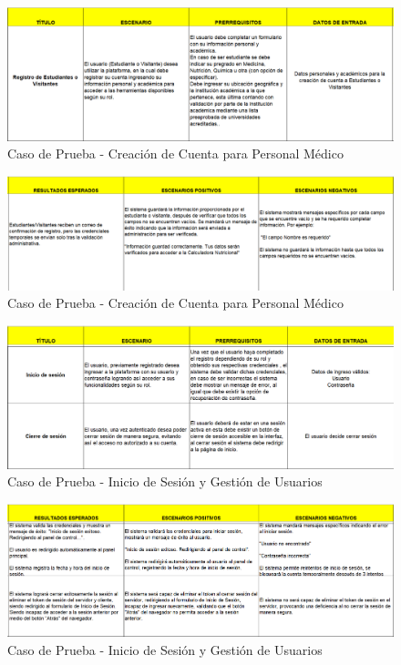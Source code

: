 \documentclass[12pt,letterpaper,spanish, xcolor=table]{report}
\numberwithin{figure}{subsection}
\begin{document}
	\begin{figure}[H]
		\centering
		\includegraphics[width=1.0\textwidth]
		{Imagenes/CalculadoraNutricional/CPCuentaEstudiante.png}
		\caption{Caso de Prueba - Creación de Cuenta para Personal Médico
		}\label{a2}
	\end{figure}
	
	\begin{figure}[H]
		\centering
		\includegraphics[width=1.0\textwidth]
		{Imagenes/CalculadoraNutricional/CPCuentaEstudiante2.png}
		\caption{Caso de Prueba - Creación de Cuenta para Personal Médico
		}\label{a2}
	\end{figure}
	
	\begin{figure}[H]
		\centering
		\includegraphics[width=1.0\textwidth]
		{Imagenes/CalculadoraNutricional/CPSesionGestion.png}
		\caption{Caso de Prueba - Inicio de Sesión y Gestión de Usuarios
		}\label{a2}
	\end{figure}
	
	\begin{figure}[H]
		\centering
		\includegraphics[width=1.0\textwidth]
		{Imagenes/CalculadoraNutricional/CPSesionGestion2.png}
		\caption{Caso de Prueba - Inicio de Sesión y Gestión de Usuarios
		}\label{a2}
	\end{figure}
	
\end{document}
